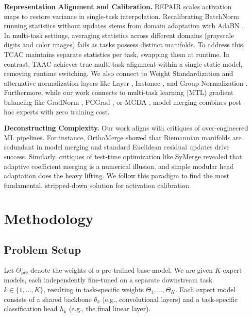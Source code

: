 \documentclass{article}
\theoremstyle{plain}
\theoremstyle{definition}
\theoremstyle{remark}
\begin{document}
\textbf{Representation Alignment and Calibration.} REPAIR \cite{jordan2022repair} scales activation maps to restore variance in single-task interpolation. Recalibrating BatchNorm \cite{ioffe2015bn} running statistics without updates stems from domain adaptation with AdaBN \cite{li2016adabn}. In multi-task settings, averaging statistics across different domains (grayscale digits and color images) fails \cite{jordan2022repair} as tasks possess distinct manifolds. To address this, TCAC maintains separate statistics per task, swapping them at runtime. In contrast, TAAC achieves true multi-task alignment within a single static model, removing runtime switching. We also connect to Weight Standardization \cite{qiao2019ws} and alternative normalization layers like Layer \cite{ba2016ln}, Instance \cite{ulyanov2016in}, and Group Normalization \cite{wu2018gn}. Furthermore, while our work connects to multi-task learning (MTL) gradient balancing like GradNorm \cite{chen2018gradnorm}, PCGrad \cite{yu2020pcgrad}, or MGDA \cite{sener2018mgda}, model merging combines post-hoc experts with zero training cost.

\textbf{Deconstructing Complexity.} Our work aligns with critiques of over-engineered ML pipelines. For instance, OrthoMerge \cite{chhanabhai2024orthomerge} showed that Riemannian manifolds are redundant in model merging and standard Euclidean residual updates drive success. Similarly, critiques of test-time optimization like SyMerge \cite{yang2024adamerging} revealed that adaptive coefficient merging is a numerical illusion, and simple modular head adaptation does the heavy lifting. We follow this paradigm to find the most fundamental, stripped-down solution for activation calibration.

\section{Methodology}
\label{submission-methodology}

\subsection{Problem Setup}
Let $\Theta_{\text{pre}}$ denote the weights of a pre-trained base model. We are given $K$ expert models, each independently fine-tuned on a separate downstream task $k \in \{1, \dots, K\}$, resulting in task-specific weights $\Theta_1, \dots, \Theta_K$. Each expert model consists of a shared backbone $\theta_k$ (e.g., convolutional layers) and a task-specific classification head $h_k$ (e.g., the final linear layer). 
\end{document}
